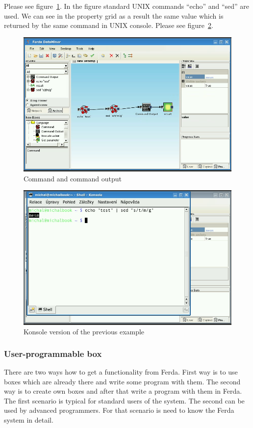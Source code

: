 \documentclass[a4paper,12pt]{book}
\begin{document}
Please see figure~\ref{fig:boxCommand}. In the figure standard UNIX commands ``echo'' and ``sed'' are used. We can see in the property grid as a result the same value which is returned by the same command in UNIX console. Please see figure~\ref{fig:CommandKonsole}.

\begin{figure}
	\includegraphics[width=1\textwidth]{command2.png}
	\caption{Command and command output}
	\label{fig:boxCommand}
\end{figure}

\begin{figure}
	\includegraphics[width=1\textwidth]{command3.png}
	\caption{Konsole version of the previous example}
	\label{fig:CommandKonsole}
\end{figure}

\subsubsection{User-programmable box}
There are two ways how to get a functionality from Ferda. First way is to use boxes which are already there and write some program with them. The second way is to create own boxes and after that write a program with them in Ferda. The first scenario is typical for standard users of the system. The second can be used by advanced programmers. For that scenario is need to know the Ferda system in detail.
\end{document}
